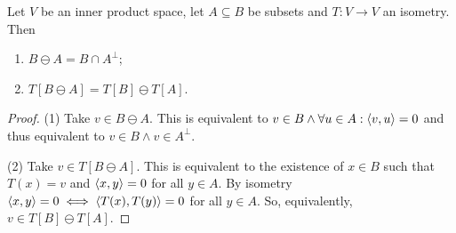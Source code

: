 \begin{proposition} \label{prop:ominusUnderIsometry}\label{prop:ominusSubspace}
Let $V$ be an inner product space, let $A\subseteq B$ be subsets and $T:V\to V$ an isometry. Then
\begin{enumerate}
\item $B\ominus A = B\cap A^\perp$;
\item $T[B\ominus A] = T[B]\ominus T[A]$.
\end{enumerate}
\end{proposition}
\begin{proof}
(1) Take $v\in B\ominus A$. This is equivalent to $v\in B \land \forall u\in A: \left\langle v,u \right\rangle =0$ and thus equivalent to $v\in B \land v\in A^\perp$.

(2) Take $v\in T[B\ominus A]$. This is equivalent to the existence of $x\in B$ such that $T(x) = v$ and $\left\langle x,y \right\rangle=0$ for all $y\in A$. By isometry $\left\langle x,y \right\rangle=0 \iff \left\langle T(x), T(y) \right\rangle=0$ for all $y\in A$. So, equivalently, $v\in T[B]\ominus T[A]$. 
\end{proof}

